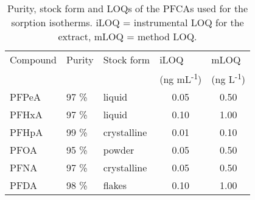 \begin{table}[hb]
    \centering
    \caption{Purity, stock form and LOQs of the PFCAs used for the sorption isotherms. iLOQ = instrumental LOQ for  the extract, mLOQ = method LOQ.}
    \label{apptab:LOQ}
    \begin{tabular}{@{}lllcc@{}}
    \toprule
    \multicolumn{1}{l}{Compound}  & \multicolumn{1}{l}{Purity}  & \multicolumn{1}{l}{Stock form} & \multicolumn{1}{l}{iLOQ} & \multicolumn{1}{l}{mLOQ}  \\ 
    & & & \multicolumn{1}{l}{(ng mL\textsuperscript{-1})}  & \multicolumn{1}{l}{(ng L\textsuperscript{-1})} \\ \midrule
     PFPeA  & 97 \%   & liquid      & 0.05 & 0.50   \\
     PFHxA  & 97 \%   & liquid      & 0.10 & 1.00   \\
     PFHpA  & 99 \%   & crystalline & 0.01 & 0.10   \\
     PFOA   & 95 \%   & powder      & 0.05 & 0.50   \\
     PFNA   & 97 \%   & crystalline & 0.05 & 0.50   \\
     PFDA   & 98 \%   & flakes      & 0.10 & 1.00   \\ \bottomrule
    \end{tabular}
\end{table}




